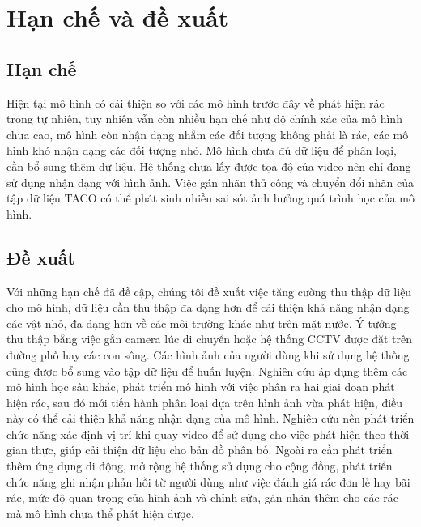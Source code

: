 \documentclass[../the.tex]{subfiles}
\begin{document}
\section{Hạn chế và đề xuất}
\subsection{Hạn chế}
{\fontsize{13}{12} \selectfont
Hiện tại mô hình có cải thiện so với các mô hình trước đây về phát hiện rác trong tự nhiên, tuy nhiên vẫn còn nhiều hạn chế như độ chính xác của mô hình chưa cao, mô hình còn nhận dạng nhằm các đối tượng không phải là rác, các mô hình khó nhận dạng các đối tượng nhỏ. Mô hình chưa đủ dữ liệu để phân loại, cần bổ sung thêm dữ liệu. Hệ thống chưa lấy được tọa độ của video nên chỉ đang sử dụng nhận dạng với hình ảnh. Việc gán nhãn thủ công và chuyển đổi nhãn của tập dữ liệu TACO có thể phát sinh nhiều sai sót ảnh hưởng quá trình học của mô hình.	

}
\subsection{Đề xuất}
{\fontsize{13}{12} \selectfont 
Với những hạn chế đã đề cập, chúng tôi đề xuất việc tăng cường thu thập dữ liệu cho mô hình, dữ liệu cần thu thập đa dạng hơn để cải thiện khả năng nhận dạng các vật nhỏ, đa dạng hơn về các môi trường khác như trên mặt nước. Ý tưởng 
thu thập bằng việc gắn camera lúc di chuyển hoặc hệ thống CCTV được đặt trên đường phố hay các con sông.
Các hình ảnh của người dùng khi sử dụng hệ thống cũng được bổ sung vào tập dữ liệu để huấn luyện. 
Nghiên cứu áp dụng thêm các mô hình học sâu khác, phát triển mô hình với việc phân ra hai giai đoạn phát hiện rác, sau đó mới tiến hành phân loại dựa trên hình ảnh vừa phát hiện, điều này có thể cải thiện khả năng nhận dạng của mô hình.
Nghiên cứu nên phát triển chức năng xác định vị trí khi quay video để sử dụng cho việc phát hiện theo thời gian thực, giúp cải thiện dữ liệu cho bản đồ phân bố.
Ngoài ra cần phát triển thêm ứng dụng di động, mở rộng hệ thống sử dụng cho cộng đồng, phát triển chức năng ghi nhận phản hồi từ người dùng như việc đánh giá rác đơn lẻ hay bãi rác, mức độ quan trọng của hình ảnh và chỉnh sửa, gán nhãn thêm cho các rác mà mô hình chưa thể phát hiện được.

}
\end{document}

